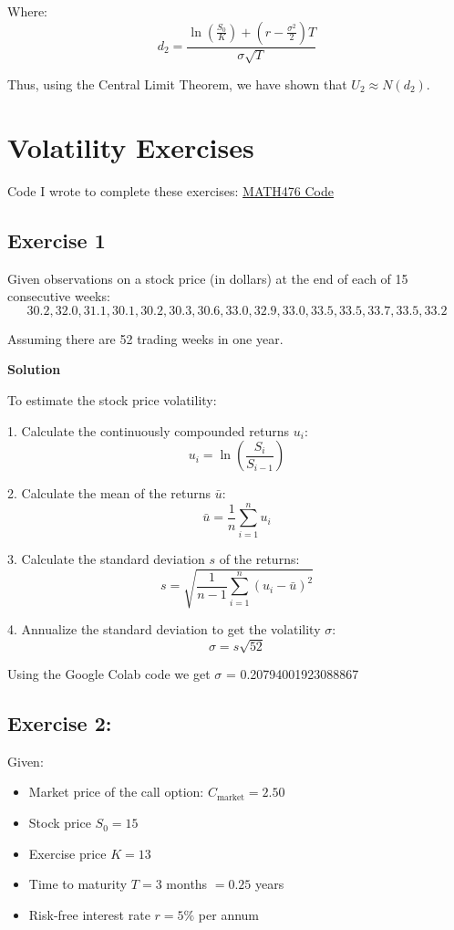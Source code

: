 \documentclass{article}
\begin{document}
Where:
\[
d_2 = \frac{\ln\left(\frac{S_0}{K}\right) + \left(r - \frac{\sigma^2}{2}\right)T}{\sigma \sqrt{T}}
\]

Thus, using the Central Limit Theorem, we have shown that \( U_2 \approx N(d_2) \).


\section{Volatility Exercises}

Code I wrote to complete these exercises: \href{https://colab.research.google.com/drive/115obfuhOtI0ZB29p7JPTUPc71tRPJW0h#scrollTo=ORupAufy6P43}{MATH476 Code}

\subsection*{Exercise 1}

Given observations on a stock price (in dollars) at the end of each of 15 consecutive weeks:
\[
30.2, 32.0, 31.1, 30.1, 30.2, 30.3, 30.6, 33.0, 32.9, 33.0, 33.5, 33.5, 33.7, 33.5, 33.2
\]

\noindent Assuming there are 52 trading weeks in one year.

\textbf{Solution}

\vspace{\baselineskip}

To estimate the stock price volatility:

\vspace{\baselineskip}


1. Calculate the continuously compounded returns \( u_i \):
\[
u_i = \ln\left(\frac{S_i}{S_{i-1}}\right)
\]

2. Calculate the mean of the returns \( \bar{u} \):
\[
\bar{u} = \frac{1}{n} \sum_{i=1}^n u_i
\]

3. Calculate the standard deviation \( s \) of the returns:
\[
s = \sqrt{\frac{1}{n-1} \sum_{i=1}^n (u_i - \bar{u})^2}
\]

4. Annualize the standard deviation to get the volatility \( \sigma \):
\[
\sigma = s \sqrt{52}
\]

Using the Google Colab code we get $\sigma$ = 0.20794001923088867

\subsection*{Exercise 2:}

Given:
\begin{itemize}
    \item Market price of the call option: \( C_{\text{market}} = 2.50 \)
    \item Stock price \( S_0 = 15 \)
    \item Exercise price \( K = 13 \)
    \item Time to maturity \( T = 3 \) months \( = 0.25 \) years
    \item Risk-free interest rate \( r = 5\% \) per annum
\end{itemize}
\end{document}
